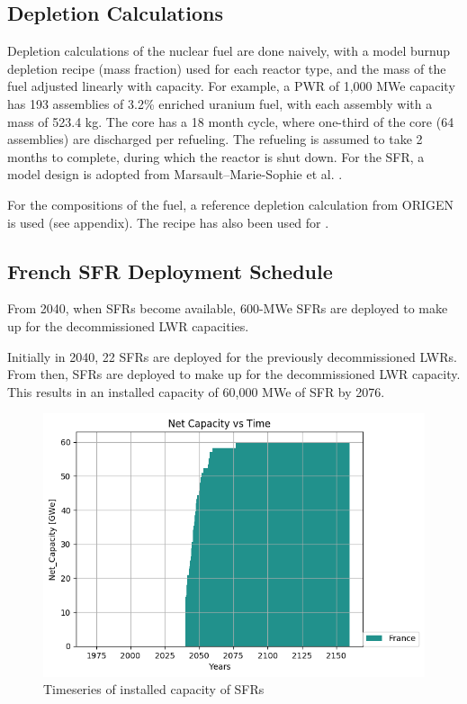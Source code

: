 \subsection{Depletion Calculations}
Depletion calculations of the nuclear fuel are done
naively, with a model burnup depletion recipe (mass fraction) used
for each reactor type, and the mass of the fuel 
adjusted linearly with capacity. For example, a PWR of
1,000 MWe capacity has 193 assemblies of 3.2\% enriched
uranium fuel, with each assembly with a mass of 523.4 kg.
The core has a 18 month cycle, where one-third of the 
core (64 assemblies) are discharged per refueling. The refueling
is assumed to take 2 months to complete, during which the reactor
is shut down. For the \gls{SFR}, a model design is adopted from
Marsault–Marie-Sophie et al. \cite{marsaultmarie-sophie_pre-conceptual_2012}.

For the compositions of the fuel, a reference depletion calculation
from ORIGEN is used (see appendix). The recipe has also been used for
\cite{wilson_adoption_2009}.

\subsection{French \gls{SFR} Deployment Schedule}

From 2040, when \gls{SFR}s become available,
600-MWe \gls{SFR}s are deployed to make up for the 
decommissioned \gls{LWR} capacities.

Initially in 2040, 22 \gls{SFR}s
are deployed for the previously decommissioned
\gls{LWR}s. From then, \glspl{SFR} are deployed to
make up for the decommissioned \gls{LWR} capacity.
This results in an installed capacity of 60,000 MWe
of \gls{SFR} by 2076.

\begin{figure}[htbp!]
	\begin{center}
		\includegraphics[scale=0.7]{./images/french-transition/power_plot.png}
	\end{center}
	\caption{Timeseries of installed capacity of \gls{SFR}s}
	\label{fig:sfr_cap}
\end{figure}


